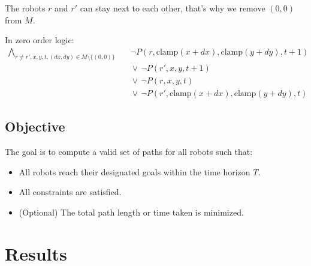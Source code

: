 \documentclass[8pt]{article}
\begin{document}
The robots $r$ and $r'$ can stay next to each other, that's why we remove $(0,0)$ from $M$.

In zero order logic:
\begin{align*}
\bigwedge_{r \neq r',x,y,t,(dx,dy)\in M \setminus \{(0,0)\}}
& \quad \neg P(r,\text{clamp}(x+dx),\text{clamp}(y+dy),t+1) \\
       & \quad \lor\, \neg P(r',x,y,t+1) \\
       & \quad \lor\, \neg P(r,x,y,t) \\
       & \quad \lor\, \neg P(r',\text{clamp}(x+dx),\text{clamp}(y+dy),t)
\end{align*}


\subsection{Objective}
The goal is to compute a valid set of paths for all robots such that:
\begin{itemize}
    \item All robots reach their designated goals within the time horizon $T$.
    \item All constraints are satisfied.
    \item (Optional) The total path length or time taken is minimized.
\end{itemize}


\section{Results}
\end{document}
